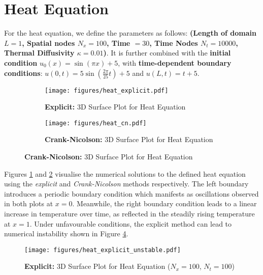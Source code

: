 %

\section{Heat Equation}\label{sec:heat_equation-results}
For the heat equation, we define the parameters as follows: \textbf{(Length of domain $L = 1$, Spatial nodes $N_x = 100$, Time $= 30$, Time Nodes $N_t = 10000$, Thermal Diffusivity $\kappa = 0.01$)}. It is further combined with the \textbf{initial condition} $u_0(x) = \sin(\pi x) + 5$, with \textbf{time-dependent boundary conditions}: $u(0,t) = 5 \sin\left(\frac{2 \pi}{25} t \right) + 5$ and $u(L,t) = t+5$.

\begin{figure}[H]
    \centering
    \begin{subfigure}[t]{0.45\textwidth}
        \centering
        \texttt{[image: figures/heat\_explicit.pdf]}
        \caption{\textbf{Explicit:} 3D Surface Plot for Heat Equation}
        \label{fig:heat-explicit-3d}
    \end{subfigure}
    \hfill
    \begin{subfigure}[t]{0.45\textwidth}
        \centering
        \texttt{[image: figures/heat\_cn.pdf]}
        \caption{\textbf{Crank-Nicolson:} 3D Surface Plot for Heat Equation}
        \label{fig:heat-cn-3d}
    \end{subfigure}
    \label{fig:heat-3d}
\end{figure}

Figures \ref{fig:heat-explicit-3d} and \ref{fig:heat-cn-3d} visualise the numerical solutions to the defined heat equation using the \textit{explicit} and \textit{Crank-Nicolson} methods respectively. The left boundary introduces a periodic boundary condition which manifests as oscillations observed in both plots at $x=0$. Meanwhile, the right boundary condition leads to a linear increase in temperature over time, as reflected in the steadily rising temperature at $x=1$. Under unfavourable conditions, the explicit method can lead to numerical instability shown in Figure \ref{fig:heat-explicit-unstable}.

\begin{figure}[H]
    \centering
    \texttt{[image: figures/heat\_explicit\_unstable.pdf]}
    \caption{\textbf{Explicit:} 3D Surface Plot for Heat Equation ($N_x = 100$, $N_t = 100$)}
    \label{fig:heat-explicit-unstable}
\end{figure}

